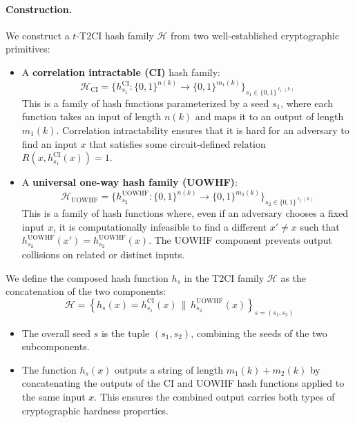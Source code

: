 \documentclass[12pt]{article}%
\begin{document}
\paragraph{Construction.}

We construct a $t$-T2CI hash family $\mathcal{H}$ from two well-established cryptographic primitives:

\begin{itemize}
    \item A \textbf{correlation intractable (CI)} hash family:
    \[
    \mathcal{H}_{\mathrm{CI}} = \{h^{\mathrm{CI}}_{s_1} : \{0,1\}^{n(k)} \to \{0,1\}^{m_1(k)}\}_{s_1 \in \{0,1\}^{\ell_1(k)}}
    \]
    This is a family of hash functions parameterized by a seed $s_1$, where each function takes an input of length $n(k)$ and maps it to an output of length $m_1(k)$. Correlation intractability ensures that it is hard for an adversary to find an input $x$ that satisfies some circuit-defined relation $R(x, h^{\mathrm{CI}}_{s_1}(x)) = 1$.

    \item A \textbf{universal one-way hash family (UOWHF)}:
    \[
    \mathcal{H}_{\mathrm{UOWHF}} = \{h^{\mathrm{UOWHF}}_{s_2} : \{0,1\}^{n(k)} \to \{0,1\}^{m_2(k)}\}_{s_2 \in \{0,1\}^{\ell_2(k)}}
    \]
    This is a family of hash functions where, even if an adversary chooses a fixed input $x$, it is computationally infeasible to find a different $x' \ne x$ such that $h^{\mathrm{UOWHF}}_{s_2}(x') = h^{\mathrm{UOWHF}}_{s_2}(x)$. The UOWHF component prevents output collisions on related or distinct inputs.
\end{itemize}

We define the composed hash function $h_s$ in the T2CI family $\mathcal{H}$ as the concatenation of the two components:
\[
\mathcal{H} = \left\{ h_s(x) = h^{\mathrm{CI}}_{s_1}(x) \, \| \, h^{\mathrm{UOWHF}}_{s_2}(x) \right\}_{s = (s_1, s_2)}
\]

\begin{itemize}
    \item The overall seed $s$ is the tuple $(s_1, s_2)$, combining the seeds of the two subcomponents.
    
    \item The function $h_s(x)$ outputs a string of length $m_1(k) + m_2(k)$ by concatenating the outputs of the CI and UOWHF hash functions applied to the same input $x$. This ensures the combined output carries both types of cryptographic hardness properties.
\end{itemize}
\end{document}
